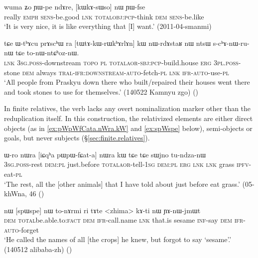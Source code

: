 \begin{exe}
\ex \label{ex:kWkAsWso}
\gll wuma ʑo ɲɯ-pe ndɤre, [kɯ\redp{}kɤ-sɯso] nɯ ɲɯ-fse   \\
really \textsc{emph} \textsc{sens}-be.good \textsc{lnk} \textsc{total}\redp{}\textsc{obj}:\textsc{pcp}-think \textsc{dem} \textsc{sens}-be.like  \\
\glt `It is very nice, it is like everything that [I] want.' (2011-04-smanmi)
\end{exe} 

\begin{exe}
\ex \label{ex:tWtAkWrWkhArlAn}
\gll  tɕe ɯ-tʰɤcu prɤscʰɯ ra [tɯ\redp{}tɤ-kɯ-rɯkʰɤrlɤn] kɯ nɯ-rdɤstaʁ nɯ ntsɯ s-cʰɤ-nɯ-ru-nɯ tɕe to-nɯ-ntɕʰoz-nɯ. \\
\textsc{lnk} \textsc{3sg}.\textsc{poss}-downstream  \textsc{topo} \textsc{pl} \textsc{total}\redp{}\textsc{aor}-\textsc{sbj}:\textsc{pcp}-build.house \textsc{erg} \textsc{3pl}.\textsc{poss}-stone \textsc{dem} always \textsc{tral}-\textsc{ifr}:\textsc{downstream}-\textsc{auto}-fetch-\textsc{pl} \textsc{lnk} \textsc{ifr}-\textsc{auto}-use-\textsc{pl} \\
\glt `All people from Praskyu down there who built/repaired their houses went there and took stones to use for themselves.' (140522 Kamnyu zgo) ()
\end{exe}

In finite relatives, the verb lacks any overt nominalization marker other than the reduplication itself. In this construction, the relativized elements are either direct objects (as in \ref{ex:pWpWfCata.nWra.kW} and \ref{ex:spWspe} below), semi-objects or goals, but never subjects (§\ref{sec:finite.relatives}).

\begin{exe}
\ex \label{ex:pWpWfCata.nWra.kW}
\gll ɯ-ro nɯra [iɕqʰa pɯ\redp{}pɯ-fɕat-a] nɯra kɯ tɕe tɕe sɯjno tu-ndza-nɯ  \\
\textsc{3sg}.\textsc{poss}-rest \textsc{dem}:\textsc{pl} just.before \textsc{total}\redp{}\textsc{aor}-tell-\textsc{1sg} \textsc{dem}:\textsc{pl} \textsc{erg} \textsc{lnk}  \textsc{lnk} grass \textsc{ipfv}-eat-\textsc{pl} \\
\glt `The rest, all the [other animals] that I have told about just before eat grass.' (05-khWna, 46
()
\end{exe}


\begin{exe}
\ex \label{ex:spWspe}
\gll nɯ [spɯ\redp{}spe] nɯ to-nɤrmi ri tɤte <zhima> kɤ-ti nɯ ɲɤ-nɯ-jmɯt \\
\textsc{dem} \textsc{total}\redp{}be.able.to:\textsc{fact} \textsc{dem} \textsc{ifr}-call.name \textsc{lnk} that.is sesame \textsc{inf}-say \textsc{dem} \textsc{ifr}-\textsc{auto}-forget \\
\glt `He called the names of all [the crops] he knew, but forgot to say `sesame'.' (140512 alibaba-zh) 	()
\end{exe}

